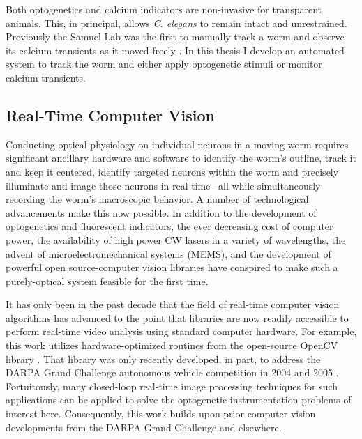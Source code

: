 
Both optogenetics and calcium indicators are non-invasive for transparent animals. This, in principal, allows \textit{C. elegans} to remain intact and unrestrained. Previously the Samuel Lab was the first to manually track a worm and observe its calcium transients as it moved freely \citep{clark_temporal_2007}. In this thesis I develop an automated system to track the worm and either apply optogenetic stimuli or monitor calcium transients.



\subsection{Real-Time Computer Vision}

Conducting optical physiology on individual neurons in a moving worm requires significant ancillary hardware and software to identify the worm's outline, track it and keep it centered, identify targeted neurons within the worm and precisely illuminate and image those neurons in real-time --all while simultaneously recording the worm's macroscopic behavior. 
A number of technological advancements  make this now possible. In addition to the development of optogenetics and fluorescent indicators, the ever decreasing cost of computer power, the  availability of high power CW lasers in a variety of wavelengths,  the advent of microelectromechanical systems (MEMS), and the development of powerful open source-computer vision libraries have  conspired to make such a purely-optical system feasible for the first time. 

It has only been in the past decade that the field of real-time computer vision algorithms has advanced to the point that libraries are now readily accessible to  perform real-time video analysis using standard computer hardware. For example, this work utilizes hardware-optimized routines from the open-source OpenCV library \citep{bradski_opencv_2000,bradski_learning_2008}. That library was only recently developed, in part, to address the DARPA Grand Challenge autonomous vehicle competition in 2004 and 2005  \citep{stavens_learning_2011,buehler_stanley:_2007}. Fortuitously, many closed-loop real-time image processing
techniques for such applications can be applied to solve the optogenetic instrumentation problems of interest here. Consequently, this work builds upon prior computer vision developments from the DARPA Grand Challenge and elsewhere.



